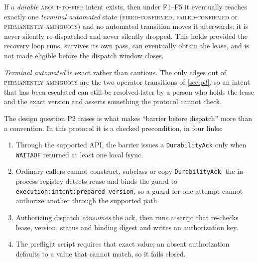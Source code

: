 \begin{property}
If a \emph{durable} \textsc{about-to-fire} intent exists, then under F1--F5 it
eventually reaches exactly one \emph{terminal automated} state
(\textsc{fired-confirmed}, \textsc{failed-confirmed} or
\textsc{permanently-ambiguous}) and no automated transition moves it
afterwards; it is never silently re-dispatched and never silently dropped.
This holds provided the recovery loop runs, survives its own pass, can
eventually obtain the lease, and is not made eligible before the dispatch
window closes.
\end{property}

\emph{Terminal automated} is exact rather than cautious. The only edges out of
\textsc{permanently-ambiguous} are the two operator transitions of
\cref{sec:p3}, so an intent that has been escalated can still be resolved
later by a person who holds the lease and the exact version and asserts
something the protocol cannot check.

The design question P2 raises is what makes ``barrier before dispatch'' more
than a convention. In this protocol it is a checked precondition, in four
links:

\begin{enumerate}
\item Through the supported API, the barrier issues a \texttt{DurabilityAck}
      only when \texttt{WAITAOF} returned at least one local fsync.
\item Ordinary callers cannot construct, subclass or copy
      \texttt{DurabilityAck}; the in-process registry detects reuse and binds
      the guard to \texttt{execution:intent:prepared\_version}, so a guard for
      one attempt cannot authorize another through the supported path.
\item Authorizing dispatch \emph{consumes} the ack, then runs a script that
      re-checks lease, version, status and binding digest and writes an
      authorization key.
\item The preflight script requires that exact value; an absent authorization
      defaults to a value that cannot match, so it fails closed.
\end{enumerate}

